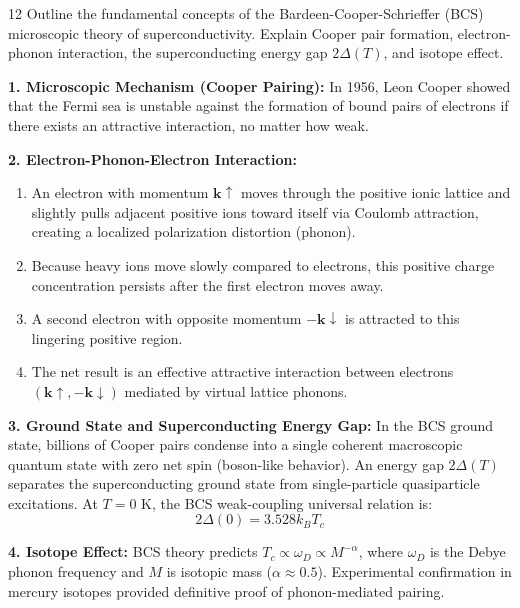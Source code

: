 \begin{theoryq}{12}
Outline the fundamental concepts of the Bardeen-Cooper-Schrieffer (BCS) microscopic theory of superconductivity. Explain Cooper pair formation, electron-phonon interaction, the superconducting energy gap $2\Delta(T)$, and isotope effect.
\end{theoryq}
\begin{theorysol}
\textbf{1. Microscopic Mechanism (Cooper Pairing):}
In 1956, Leon Cooper showed that the Fermi sea is unstable against the formation of bound pairs of electrons if there exists an attractive interaction, no matter how weak.

\textbf{2. Electron-Phonon-Electron Interaction:}
\begin{enumerate}
\item An electron with momentum $\mathbf{k}\uparrow$ moves through the positive ionic lattice and slightly pulls adjacent positive ions toward itself via Coulomb attraction, creating a localized polarization distortion (phonon).
\item Because heavy ions move slowly compared to electrons, this positive charge concentration persists after the first electron moves away.
\item A second electron with opposite momentum $-\mathbf{k}\downarrow$ is attracted to this lingering positive region.
\item The net result is an effective attractive interaction between electrons $(\mathbf{k}\uparrow, -\mathbf{k}\downarrow)$ mediated by virtual lattice phonons.
\end{enumerate}

\textbf{3. Ground State and Superconducting Energy Gap:}
In the BCS ground state, billions of Cooper pairs condense into a single coherent macroscopic quantum state with zero net spin (boson-like behavior).
An energy gap $2\Delta(T)$ separates the superconducting ground state from single-particle quasiparticle excitations.
At $T = 0\text{ K}$, the BCS weak-coupling universal relation is:
\begin{equation}
2\Delta(0) = 3.528 k_B T_c
\end{equation}

\textbf{4. Isotope Effect:}
BCS theory predicts $T_c \propto \omega_D \propto M^{-\alpha}$, where $\omega_D$ is the Debye phonon frequency and $M$ is isotopic mass ($\alpha \approx 0.5$). Experimental confirmation in mercury isotopes provided definitive proof of phonon-mediated pairing.
\end{theorysol}
\vspace{4mm}

